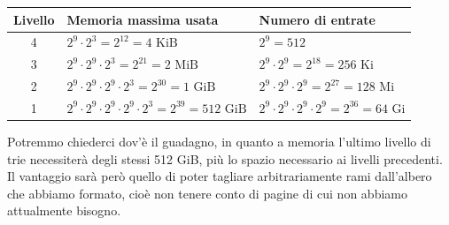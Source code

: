 \documentclass[a4paper,11pt]{article}
\begin{document}
\begin{table}[H]
	\center {}
	\begin{tabular} { c | p{6cm} | p{6cm} }
		\bfseries Livello & \bfseries Memoria massima usata & \bfseries Numero di entrate \\ 
		\hline 
		4 & $2^9 \cdot 2^3 = 2^{12} = 4 \text{ KiB}$                       & $2^9 = 512$ \\
		3 & $2^9 \cdot 2^9 \cdot 2^3 = 2^{21} = 2 \text{ MiB}$             & $2^9 \cdot 2^9 = 2^{18} = 256 \text{ Ki}$ \\            
		2 & $2^9 \cdot 2^9 \cdot 2^9 \cdot 2^3 = 2^{30} = 1 \text{ GiB}$   & $2^9 \cdot 2^9 \cdot 2^9 = 2^{27} = 128 \text{ Mi}$ \\ 
		1 & $2^9 \cdot 2^9 \cdot 2^9 \cdot 2^9 \cdot 2^3 = 2^{39} = 512 \text{ GiB}$ & $2^9 \cdot 2^9 \cdot 2^9 \cdot 2^9 = 2^{36} = 64 \text{ Gi}$
	\end{tabular}
\end{table}

Potremmo chiederci dov'è il guadagno, in quanto a memoria l'ultimo livello di trie necessiterà degli stessi 512 GiB, più lo spazio necessario ai livelli precedenti.
Il vantaggio sarà però quello di poter tagliare arbitrariamente rami dall'albero che abbiamo formato, cioè non tenere conto di pagine di cui non abbiamo attualmente bisogno. 
\end{document}
